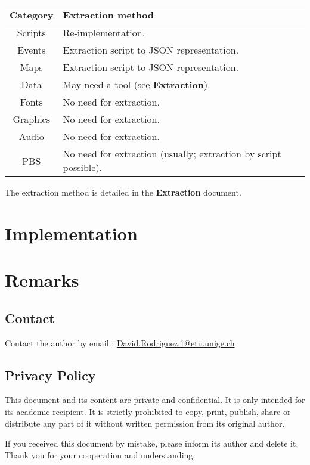 \documentclass[11pt]{article}
\begin{document}
\begin{tabular}{|c |L{.6\linewidth}|}
	\hline
	\textbf{Category} & \textbf{Extraction method} \\
	\hline
	Scripts & Re-implementation. \\
	\hline
	Events & Extraction script to JSON representation. \\
	\hline
	Maps & Extraction script to JSON representation. \\
	\hline
	Data & May need a tool (see \textbf{Extraction}).  \\
	\hline
	Fonts & No need for extraction. \\
	\hline
	Graphics & No need for extraction. \\
	\hline
	Audio & No need for extraction. \\
	\hline
	PBS & No need for extraction (usually; extraction by script possible). \\
	\hline
\end{tabular}

The extraction method is detailed in the \textbf{Extraction} document.






\newpage
\section{Implementation}










\newpage
\section{Remarks}

\subsection{Contact}

Contact the author by email : \href{mailto:David.Rodriguez.1@etu.unige.ch}{David.Rodriguez.1@etu.unige.ch}

\subsection{Privacy Policy}
\label{sec:privacypolice}

This document and its content are private and confidential. It is only intended for its academic recipient. It is strictly prohibited to copy, print, publish, share or distribute any part of it without written permission from its original author.

If you received this document by mistake, please inform its author and delete it. Thank you for your cooperation and understanding.
\end{document}
